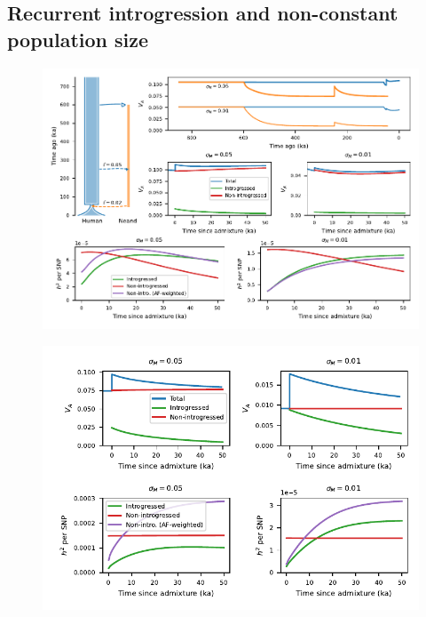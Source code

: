 \documentclass{article}
\begin{document}
\subsection*{Recurrent introgression and non-constant population size}


\begin{figure}[ht!]
    \centering
    \includegraphics{../figures/neanderthal_admixture.pdf}
    \caption{
        \textbf{}
    }
    \label{fig:neand-to-human}
\end{figure}

\begin{figure}[ht!]
    \centering
    \includegraphics{../figures/human_admixture.pdf}
    \caption{
        \textbf{}
    }
    \label{fig:human-to-neand}
\end{figure}
\end{document}
